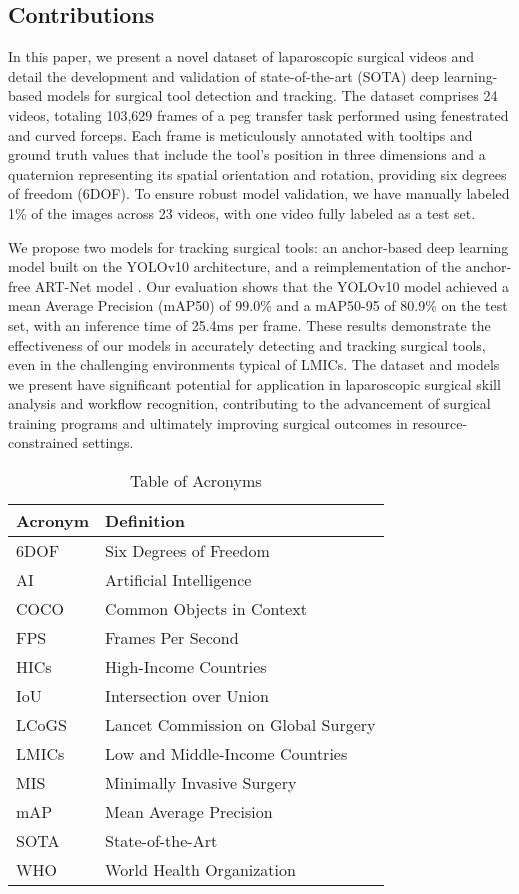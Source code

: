 \subsection{Contributions}

In this paper, we present a novel dataset of laparoscopic surgical videos and detail the development and validation of state-of-the-art (SOTA) deep learning-based models for surgical tool detection and tracking. The dataset comprises 24 videos, totaling 103,629 frames of a peg transfer task performed using fenestrated and curved forceps. Each frame is meticulously annotated with tooltips and ground truth values that include the tool's position in three dimensions and a quaternion representing its spatial orientation and rotation, providing six degrees of freedom (6DOF). To ensure robust model validation, we have manually labeled 1\% of the images across 23 videos, with one video fully labeled as a test set.

We propose two models for tracking surgical tools: an anchor-based deep learning model built on the YOLOv10 architecture, and a reimplementation of the anchor-free ART-Net model \cite{hasan_detection_2021}. Our evaluation shows that the YOLOv10 model achieved a mean Average Precision (mAP50) of 99.0\% and a mAP50-95 of 80.9\% on the test set, with an inference time of 25.4ms per frame. These results demonstrate the effectiveness of our models in accurately detecting and tracking surgical tools, even in the challenging environments typical of LMICs. The dataset and models we present have significant potential for application in laparoscopic surgical skill analysis and workflow recognition, contributing to the advancement of surgical training programs and ultimately improving surgical outcomes in resource-constrained settings.

\begin{table}[h]
    \centering
    \caption{Table of Acronyms}
    \begin{tabular}{ll}
      \toprule
      \textbf{Acronym} & \textbf{Definition} \\
      \midrule
      6DOF & Six Degrees of Freedom \\
      AI & Artificial Intelligence \\
      COCO & Common Objects in Context \\
      FPS & Frames Per Second \\
      HICs & High-Income Countries \\
      IoU & Intersection over Union \\
      LCoGS & Lancet Commission on Global Surgery \\
      LMICs & Low and Middle-Income Countries \\
      MIS & Minimally Invasive Surgery \\
      mAP & Mean Average Precision \\
      SOTA & State-of-the-Art \\
      WHO & World Health Organization \\
      \bottomrule
    \end{tabular}
    \label{tab:acronyms}
  \end{table}
